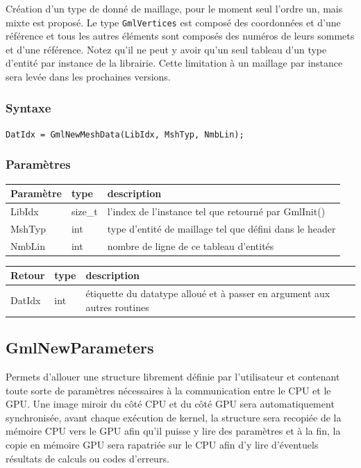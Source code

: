 \documentclass[a4paper,12pt]{article}
\begin{document}
Création d'un type de donné de maillage, pour le moment seul l'ordre un, mais mixte est proposé.
Le type {\tt GmlVertices} est composé des coordonnées et d'une référence et tous les autres éléments sont composés des numéros de leurs sommets et d'une référence.
Notez qu'il ne peut y avoir qu'un seul tableau d'un type d'entité par instance de la librairie.
Cette limitation à un maillage par instance sera levée dans les prochaines versions.

\subsubsection*{Syntaxe}

{\tt DatIdx = GmlNewMeshData(LibIdx, MshTyp, NmbLin);}

\subsubsection*{Paramètres}

\begin{tabular}{|m{2cm}|m{1.5cm}|m{10.5cm}|}
\hline
Paramètre  & type    & description \\
\hline
LibIdx     & size\_t & l'index de l'instance tel que retourné par GmlInit() \\
\hline
MshTyp     & int     & type d'entité de maillage tel que défini dans le header \\
\hline
NmbLin     & int     & nombre de ligne de ce tableau d'entités \\
\hline
\end{tabular}

\medskip

\begin{tabular}{|m{2cm}|m{1.5cm}|m{10.5cm}|}
\hline
Retour     & type   & description \\
\hline
DatIdx     & int    & étiquette du datatype alloué et à passer en argument aux autres routines \\
\hline
\end{tabular}


\subsection{GmlNewParameters}

Permets d'allouer une structure librement définie par l'utilisateur et contenant toute sorte de paramètres nécessaires à la communication entre le CPU et le GPU.
Une image miroir du côté CPU et du côté GPU sera automatiquement synchronisée, avant chaque exécution de kernel, la structure sera recopiée de la mémoire CPU vers le GPU afin qu'il puisse y lire des paramètres et à la fin, la copie en mémoire GPU sera rapatriée sur le CPU afin d'y lire d'éventuels résultats de calculs ou codes d'erreurs.
\end{document}
